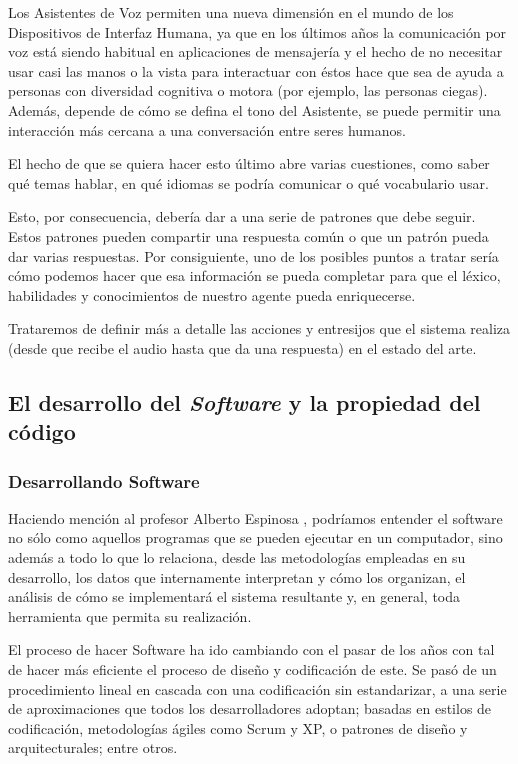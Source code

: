 Los Asistentes de Voz permiten una nueva dimensión en el mundo de los Dispositivos de Interfaz Humana, ya que en los últimos años la comunicación por voz está siendo habitual en aplicaciones de mensajería y el hecho de no necesitar usar casi las manos o la vista para interactuar con éstos hace que sea de ayuda a personas con diversidad cognitiva o motora (por ejemplo, las personas ciegas). Además, depende de cómo se defina el tono del Asistente, se puede permitir una interacción más cercana a una conversación entre seres humanos.

El hecho de que se quiera hacer esto último abre varias cuestiones, como saber qué temas hablar, en qué idiomas se podría comunicar o qué vocabulario usar.

Esto, por consecuencia, debería dar a una serie de patrones que debe seguir. Estos patrones pueden compartir una respuesta común o que un patrón pueda dar varias respuestas. Por consiguiente, uno de los posibles puntos a tratar sería cómo podemos hacer que esa información se pueda completar para que el léxico, habilidades y conocimientos de nuestro agente pueda enriquecerse.

Trataremos de definir más a detalle las acciones y entresijos que el sistema realiza (desde que recibe el audio hasta que da una respuesta) en el estado del arte.

\subsection{El desarrollo del \textit{Software} y la propiedad del código }
\subsubsection{Desarrollando Software}
Haciendo mención al profesor Alberto Espinosa \cite{Prieto2006-ss}, podríamos entender el software no sólo como aquellos programas que se pueden ejecutar en un computador, sino además a todo lo que lo relaciona, desde las metodologías empleadas en su desarrollo, los datos que internamente interpretan y cómo los organizan, el análisis de cómo se implementará el sistema resultante y, en general, toda herramienta que permita su realización. 

El proceso de hacer Software ha ido cambiando con el pasar de los años con tal de hacer más eficiente el proceso de diseño y codificación de este. Se pasó de un procedimiento lineal en cascada con una codificación sin estandarizar, a una serie de aproximaciones que todos los desarrolladores adoptan; basadas en estilos de codificación, metodologías ágiles como Scrum y XP, o patrones de diseño y arquitecturales; entre otros. 

